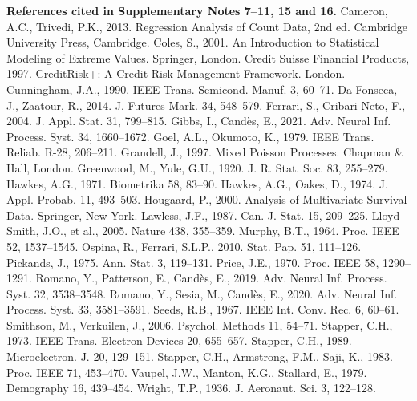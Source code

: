 \textbf{References cited in Supplementary Notes 7–11, 15 and 16.} Cameron, A.C., Trivedi, P.K., 2013. Regression Analysis of Count Data, 2nd ed. Cambridge University Press, Cambridge. Coles, S., 2001. An Introduction to Statistical Modeling of Extreme Values. Springer, London. Credit Suisse Financial Products, 1997. CreditRisk+: A Credit Risk Management Framework. London. Cunningham, J.A., 1990. IEEE Trans. Semicond. Manuf. 3, 60–71. Da Fonseca, J., Zaatour, R., 2014. J. Futures Mark. 34, 548–579. Ferrari, S., Cribari-Neto, F., 2004. J. Appl. Stat. 31, 799–815. Gibbs, I., Candès, E., 2021. Adv. Neural Inf. Process. Syst. 34, 1660–1672. Goel, A.L., Okumoto, K., 1979. IEEE Trans. Reliab. R-28, 206–211. Grandell, J., 1997. Mixed Poisson Processes. Chapman \& Hall, London. Greenwood, M., Yule, G.U., 1920. J. R. Stat. Soc. 83, 255–279. Hawkes, A.G., 1971. Biometrika 58, 83–90. Hawkes, A.G., Oakes, D., 1974. J. Appl. Probab. 11, 493–503. Hougaard, P., 2000. Analysis of Multivariate Survival Data. Springer, New York. Lawless, J.F., 1987. Can. J. Stat. 15, 209–225. Lloyd-Smith, J.O., et al., 2005. Nature 438, 355–359. Murphy, B.T., 1964. Proc. IEEE 52, 1537–1545. Ospina, R., Ferrari, S.L.P., 2010. Stat. Pap. 51, 111–126. Pickands, J., 1975. Ann. Stat. 3, 119–131. Price, J.E., 1970. Proc. IEEE 58, 1290–1291. Romano, Y., Patterson, E., Candès, E., 2019. Adv. Neural Inf. Process. Syst. 32, 3538–3548. Romano, Y., Sesia, M., Candès, E., 2020. Adv. Neural Inf. Process. Syst. 33, 3581–3591. Seeds, R.B., 1967. IEEE Int. Conv. Rec. 6, 60–61. Smithson, M., Verkuilen, J., 2006. Psychol. Methods 11, 54–71. Stapper, C.H., 1973. IEEE Trans. Electron Devices 20, 655–657. Stapper, C.H., 1989. Microelectron. J. 20, 129–151. Stapper, C.H., Armstrong, F.M., Saji, K., 1983. Proc. IEEE 71, 453–470. Vaupel, J.W., Manton, K.G., Stallard, E., 1979. Demography 16, 439–454. Wright, T.P., 1936. J. Aeronaut. Sci. 3, 122–128.
